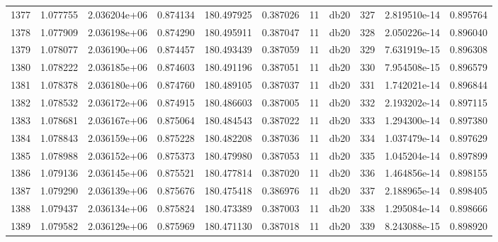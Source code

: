 \begin{tabular}{lrrrrrrlrrr}
1377 &    1.077755 &        2.036204e+06 &  0.874134 &              180.497925 &    0.387026 &      11 &         db20 &    327 &   2.819510e-14 &      0.895764 \\
1378 &    1.077909 &        2.036198e+06 &  0.874290 &              180.495911 &    0.387047 &      11 &         db20 &    328 &   2.050226e-14 &      0.896040 \\
1379 &    1.078077 &        2.036190e+06 &  0.874457 &              180.493439 &    0.387059 &      11 &         db20 &    329 &   7.631919e-15 &      0.896308 \\
1380 &    1.078222 &        2.036185e+06 &  0.874603 &              180.491196 &    0.387051 &      11 &         db20 &    330 &   7.954508e-15 &      0.896579 \\
1381 &    1.078378 &        2.036180e+06 &  0.874760 &              180.489105 &    0.387037 &      11 &         db20 &    331 &   1.742021e-14 &      0.896844 \\
1382 &    1.078532 &        2.036172e+06 &  0.874915 &              180.486603 &    0.387005 &      11 &         db20 &    332 &   2.193202e-14 &      0.897115 \\
1383 &    1.078681 &        2.036167e+06 &  0.875064 &              180.484543 &    0.387022 &      11 &         db20 &    333 &   1.294300e-14 &      0.897380 \\
1384 &    1.078843 &        2.036159e+06 &  0.875228 &              180.482208 &    0.387036 &      11 &         db20 &    334 &   1.037479e-14 &      0.897629 \\
1385 &    1.078988 &        2.036152e+06 &  0.875373 &              180.479980 &    0.387053 &      11 &         db20 &    335 &   1.045204e-14 &      0.897899 \\
1386 &    1.079136 &        2.036145e+06 &  0.875521 &              180.477814 &    0.387020 &      11 &         db20 &    336 &   1.464856e-14 &      0.898155 \\
1387 &    1.079290 &        2.036139e+06 &  0.875676 &              180.475418 &    0.386976 &      11 &         db20 &    337 &   2.188965e-14 &      0.898405 \\
1388 &    1.079437 &        2.036134e+06 &  0.875824 &              180.473389 &    0.387003 &      11 &         db20 &    338 &   1.295084e-14 &      0.898666 \\
1389 &    1.079582 &        2.036129e+06 &  0.875969 &              180.471130 &    0.387018 &      11 &         db20 &    339 &   8.243088e-15 &      0.898920 \\

\end{tabular}

